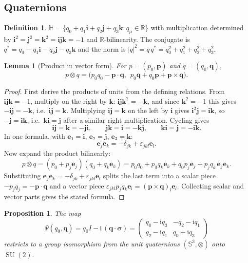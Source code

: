 \documentclass[11pt]{article}
\DeclareMathOperator{\SU}{SU}
\newcommand{\R}{\mathbb{R}}
\newcommand{\HH}{\mathbb{H}}
\newcommand{\Sph}{\mathbb{S}}
\newcommand{\vv}[1]{\bm{#1}}
\newcommand{\ii}{\mathrm{i}}
\theoremstyle{plain}
\newtheorem{proposition}[theorem]{Proposition}
\newtheorem{lemma}[theorem]{Lemma}
\theoremstyle{definition}
\newtheorem{definition}[theorem]{Definition}
\begin{document}
\subsection{Quaternions}

\begin{definition}
$\HH=\{q_0+q_1\mathbf i+q_2\mathbf j+q_3\mathbf k: q_\mu\in\R\}$ with multiplication determined by
$\mathbf i^2=\mathbf j^2=\mathbf k^2=\mathbf i\mathbf j\mathbf k=-1$ and $\R$-bilinearity. The
conjugate is $q^{*}=q_0-q_1\mathbf i-q_2\mathbf j-q_3\mathbf k$ and the norm is
$|q|^2=q\,q^{*}=q_0^2+q_1^2+q_2^2+q_3^2$.
\end{definition}

\begin{lemma}[Product in vector form]\label{lem:qprod}
For $p=(p_0,\vv p)$ and $q=(q_0,\vv q)$,
\[
p\otimes q=\big(p_0q_0-\vv p\cdot\vv q,\ \ p_0\vv q+q_0\vv p+\vv p\times\vv q\big).
\]
\end{lemma}

\begin{proof}
First derive the products of units from the defining relations. From $\mathbf i\mathbf j\mathbf
k=-1$, multiply on the right by $\mathbf k$: $\mathbf i\mathbf j\mathbf k^2=-\mathbf k$, and since
$\mathbf k^2=-1$ this gives $-\mathbf i\mathbf j=-\mathbf k$, i.e.\ $\mathbf i\mathbf j=\mathbf k$.
Multiplying $\mathbf i\mathbf j=\mathbf k$ on the left by $\mathbf i$ gives
$\mathbf i^2\mathbf j=\mathbf i\mathbf k$, so $-\mathbf j=\mathbf i\mathbf k$, i.e.\
$\mathbf k\mathbf i=\mathbf j$ after a similar right multiplication. Cycling gives
\[
\mathbf i\mathbf j=\mathbf k=-\mathbf j\mathbf i,\qquad
\mathbf j\mathbf k=\mathbf i=-\mathbf k\mathbf j,\qquad
\mathbf k\mathbf i=\mathbf j=-\mathbf i\mathbf k .
\]
In one formula, with $\mathbf e_1=\mathbf i$, $\mathbf e_2=\mathbf j$, $\mathbf e_3=\mathbf k$:
\[
\mathbf e_j\mathbf e_k=-\delta_{jk}+\varepsilon_{jkl}\mathbf e_l .
\]
Now expand the product bilinearly:
\[
p\otimes q=(p_0+p_j\mathbf e_j)(q_0+q_k\mathbf e_k)
=p_0q_0+p_0q_k\mathbf e_k+q_0p_j\mathbf e_j+p_jq_k\,\mathbf e_j\mathbf e_k .
\]
Substituting $\mathbf e_j\mathbf e_k=-\delta_{jk}+\varepsilon_{jkl}\mathbf e_l$ splits the last term
into a scalar piece $-p_jq_j=-\vv p\cdot\vv q$ and a vector piece
$\varepsilon_{jkl}p_jq_k\mathbf e_l=(\vv p\times\vv q)_l\mathbf e_l$. Collecting scalar and vector
parts gives the stated formula.
\end{proof}

\begin{proposition}\label{prop:S3SU2}
The map
\[
\Psi(q_0,\vv q)=q_0I-\ii\,(\vv q\cdot\vv\sigma)
=\begin{pmatrix} q_0-\ii q_3 & -q_2-\ii q_1\\ q_2-\ii q_1& q_0+\ii q_3\end{pmatrix}
\]
restricts to a group isomorphism from the unit quaternions $(\Sph^3,\otimes)$ onto $\SU(2)$.
\end{proposition}
\end{document}
